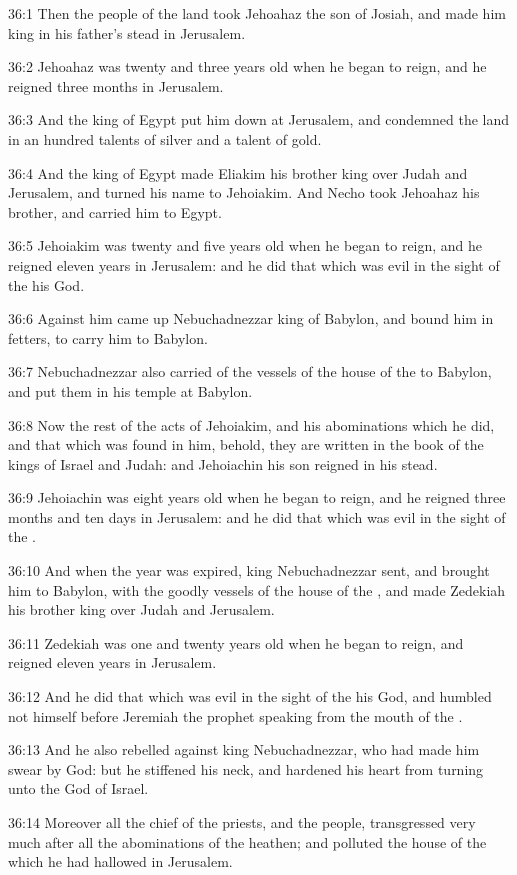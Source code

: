 36:1 Then the people of the land took Jehoahaz the son of Josiah, and made him king in his father's stead in Jerusalem.

36:2 Jehoahaz was twenty and three years old when he began to reign, and he reigned three months in Jerusalem.

36:3 And the king of Egypt put him down at Jerusalem, and condemned the land in an hundred talents of silver and a talent of gold.

36:4 And the king of Egypt made Eliakim his brother king over Judah and Jerusalem, and turned his name to Jehoiakim. And Necho took Jehoahaz his brother, and carried him to Egypt.

36:5 Jehoiakim was twenty and five years old when he began to reign, and he reigned eleven years in Jerusalem: and he did that which was evil in the sight of the \LORD his God.

36:6 Against him came up Nebuchadnezzar king of Babylon, and bound him in fetters, to carry him to Babylon.

36:7 Nebuchadnezzar also carried of the vessels of the house of the \LORD to Babylon, and put them in his temple at Babylon.

36:8 Now the rest of the acts of Jehoiakim, and his abominations which he did, and that which was found in him, behold, they are written in the book of the kings of Israel and Judah: and Jehoiachin his son reigned in his stead.

36:9 Jehoiachin was eight years old when he began to reign, and he reigned three months and ten days in Jerusalem: and he did that which was evil in the sight of the \LORD.

36:10 And when the year was expired, king Nebuchadnezzar sent, and brought him to Babylon, with the goodly vessels of the house of the \LORD, and made Zedekiah his brother king over Judah and Jerusalem.

36:11 Zedekiah was one and twenty years old when he began to reign, and reigned eleven years in Jerusalem.

36:12 And he did that which was evil in the sight of the \LORD his God, and humbled not himself before Jeremiah the prophet speaking from the mouth of the \LORD.

36:13 And he also rebelled against king Nebuchadnezzar, who had made him swear by God: but he stiffened his neck, and hardened his heart from turning unto the \LORD God of Israel.

36:14 Moreover all the chief of the priests, and the people, transgressed very much after all the abominations of the heathen; and polluted the house of the \LORD which he had hallowed in Jerusalem.

